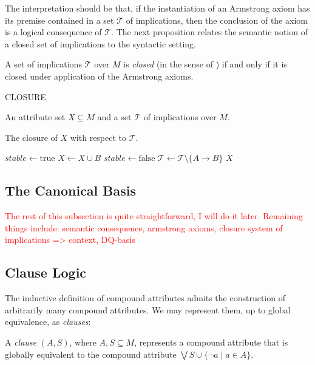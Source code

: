 The interpretation should be that, if the instantiation of an Armstrong axiom has its premise contained in a set $\mathcal{T}$
of implications, then the conclusion of the axiom is a logical consequence of $\mathcal{T}$. The next proposition relates
the semantic notion of a closed set of implications to the syntactic setting.

\begin{proposition}
	\label{proposition:armstrong-closed}

	A set of implications $\mathcal{T}$ over $M$ is \emph{closed} (in the sense of )
	if and only if it is closed under application of the Armstrong axioms.
\end{proposition}



\begin{algo}
	{CLOSURE}

	\label{algorithm:Closure}

	\Require An attribute set $X\subseteq M$ and a set $\mathcal{T}$ of implications over $M$.

	\Ensure The closure of $X$ with respect to $\mathcal{T}$.

	\Repeat \State $stable \gets \text{true}$   \State $X \gets X \cup
	B$ \State $stable \gets \text{false}$ \State $\mathcal{T}\gets \mathcal{T}\setminus \{A \to B\}$ \EndIf \EndFor {}
	\State \Return $X$
\end{algo}


\subsection{The Canonical Basis}
\label{subsection:the-canonical-basis}

\textcolor{red}{The rest of this subsection is quite straightforward, I will do it later. Remaining things include: semantic
consequence, armstrong axioms, closure system of implications => context, DQ-basis}

\clearpage
\subsection{Clause Logic}
\label{subsection:clause-logic}

The inductive definition of compound attributes admits the construction of arbitrarily many compound attributes. We may
represent them, up to global equivalence, as \textit{clauses}:
\begin{definition}
	\label{definition:clauses}

	A \emph{clause} $(A,S)$, where $A,S \subseteq M$, represents a compound attribute that is globally equivalent to the compound
	attribute $\bigvee S \cup \{\neg a \mid a \in A\}$.
\end{definition}

